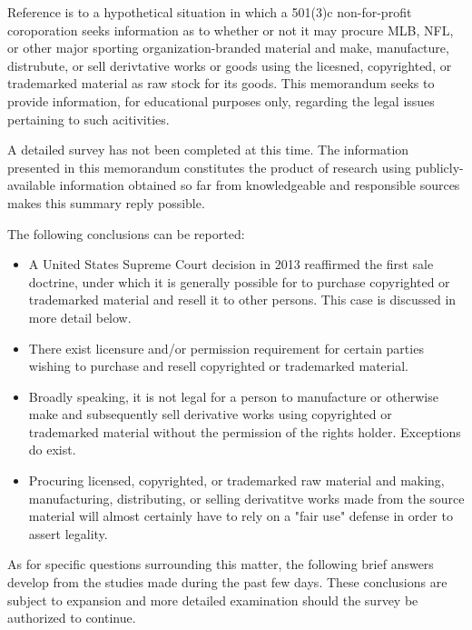 \documentclass[letterpaper,11pt]{texMemo}
\begin{document}
\maketitle


  Reference is to a hypothetical situation in which a 501(3)c non-for-profit coroporation seeks information as to whether or not it may procure MLB, NFL, or other major sporting organization-branded material and make, manufacture, distrubute, or sell derivtative works or goods using the licesned, copyrighted, or trademarked material as raw stock for its goods. This memorandum seeks to provide information, for educational purposes only, regarding the legal issues pertaining to such acitivities.

  A detailed survey has not been completed at this time. The information presented in this memorandum constitutes the product of research using publicly-available information obtained so far from knowledgeable and responsible sources makes this summary reply possible.

  The following conclusions can be reported:

  \begin{itemize}
   \item A United States Supreme Court decision in 2013 reaffirmed the first sale doctrine, under which it is generally possible for to purchase copyrighted or trademarked material and resell it to other persons. This case is discussed in more detail below.
   \item There exist licensure and/or permission requirement for certain parties wishing to purchase and resell copyrighted or trademarked material.
   \item Broadly speaking, it is not legal for a person to manufacture or otherwise make and subsequently sell derivative works using copyrighted or trademarked material without the permission of the rights holder. Exceptions do exist.
   \item Procuring licensed, copyrighted, or trademarked raw material and making, manufacturing, distributing, or selling derivatitve works made from the source material will almost certainly have to rely on a "fair use" defense in order to assert legality.
  \end{itemize}

  As for specific questions surrounding this matter, the following brief answers develop from the studies made during the past few days. These conclusions are subject to expansion and more detailed examination should the survey be authorized to continue.
\end{document}
